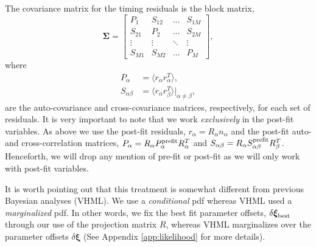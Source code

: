 \documentclass[iop]{emulateapj}
\newcommand{\be}{\begin{equation}}
\newcommand{\ee}{\end{equation}}
\newcommand{\bb}{\begin{bmatrix}}
\newcommand{\eb}{\end{bmatrix}}
\begin{document}
The covariance matrix for the timing residuals is the block matrix,
\be
\label{eq:cov}
\boldsymbol{\Sigma}=\bb  P_{1} & S_{12} & \hdots & S_{1M}\\ 
S_{21} & P_{2} & \hdots & S_{2M}\\
\vdots & \vdots & \ddots & \vdots\\
S_{M1} & S_{M2} & \hdots & P_{M}\eb,
\ee
where
\begin{align}
P_{{\alpha}}&=\langle r_{\alpha}r_{\alpha}^{T}\rangle,\\
S_{\alpha\beta}&=\langle r_{\alpha}r_{\beta}^{T}\rangle\big|_{\alpha\ne \beta},
\end{align}
are the auto-covariance and cross-covariance matrices, respectively, for each set of residuals. It is very important to note that we work \emph{exclusively} in the post-fit variables. As above we use the post-fit residuals, $r_\alpha=R_\alpha n_\alpha$ and the post-fit auto- and cross-correlation matrices, $P_{\alpha}=R_{\alpha}P_{\alpha}^{\rm prefit}R_{\alpha}^{T}$ and $S_{\alpha\beta}=R_{\alpha}S_{\alpha\beta}^{\rm prefit}R_{\beta}^{T}$. Henceforth, we will drop any mention of pre-fit or post-fit as we will only work with post-fit variables. 

It is worth pointing out that this treatment is somewhat different from previous Bayesian analyses  \citep{hlm+09,vl10,vhj+11} (VHML). We use a \emph{conditional} pdf whereas VHML used a \emph{marginalized} pdf. In other words, we fix the best fit parameter offsets, $\delta\boldsymbol{\xi}_{\rm best}$ through our use of the projection matrix $R$, whereas VHML marginalizes over the parameter offsets $\delta\boldsymbol{\xi}$ (See Appendix \ref{app:likelihood} for more details).
\end{document}
